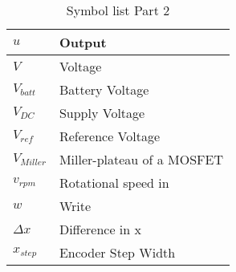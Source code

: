 \begin{table}[H]
\begin{tabular}{|l|l|}
$u$                  & Output                                         \\ \hline
$V$                  & Voltage                                        \\ \hline
$V_{batt}$           & Battery Voltage                                \\ \hline
$V_{DC}$             & Supply Voltage                                 \\ \hline
$V_{ref}$            & Reference Voltage                              \\ \hline
$V_{Miller}$         & Miller-plateau of a MOSFET                     \\ \hline
$v_{rpm}$            & Rotational speed in                            \\ \hline
$w$                  & Write                                          \\ \hline
$\Delta x$           & Difference in x                                \\ \hline
$x_{step}$           & Encoder Step  Width                            \\ \hline
\end{tabular}
\caption{Symbol list Part 2}

\end{table}